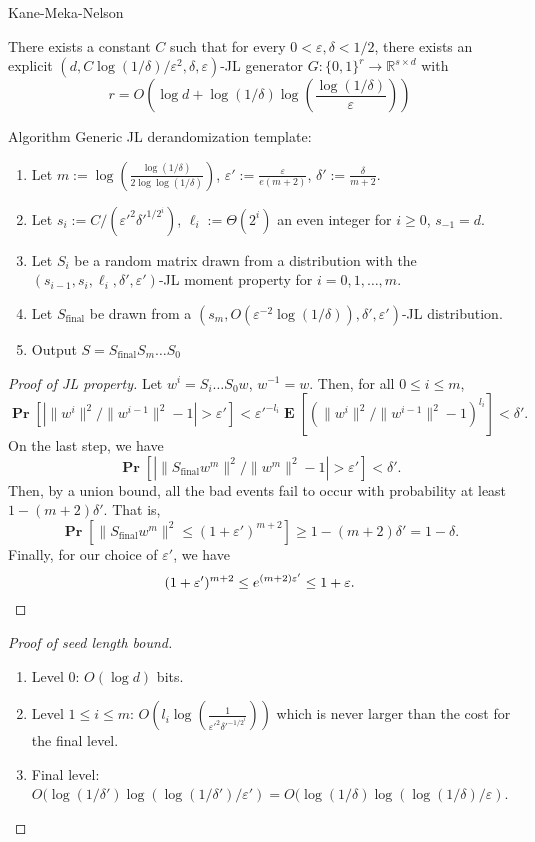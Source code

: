 \documentclass[10pt]{beamer}
\newcommand{\R}{\mathbb{R}}
\renewcommand{\P}{\operatorname*{\mathbf{Pr}}}
\newcommand{\E}{\operatorname*{\mathbf{E}}}
\renewcommand{\l}{\left}
\renewcommand{\r}{\right}
\newcommand{\eps}{\varepsilon}
\renewcommand{\d}{\displaystyle}
\begin{document}
\begin{frame}[allowframebreaks]{Kane-Meka-Nelson}
  \begin{theorem}
    \label{thm:main}
    There exists a constant $C$ such that for every
    $0<\eps,\delta<1/2$, there exists an explicit
    $(d,C\log(1/\delta)/\eps^2,\delta,\eps)$-JL generator
    $G:\{0,1\}^r\to \R^{s\times d}$ with
    \[
    r=O \l(\log d + \log(1/\delta)\log \l(\frac{\log(1/\delta)}{\eps}\r)\r)
    \]
  \end{theorem}

  \begin{block}{Algorithm}
    Generic JL derandomization template:
    \begin{enumerate}
    \item Let $m:=\d\log
      \l(\frac{\log(1/\delta)}{2\log\log(1/\delta)}\r)$,
      $\eps':=\d\frac{\eps}{e(m+2)}$, $\delta':=\d\frac{\delta}{m+2}$.
    \item Let $s_i:=C/(\eps'^2\delta'^{1/2^i})$, $\ell_i:=\Theta(2^i)$
      an even integer for $i\geq0$, $s_{-1}=d$.
    \item Let $S_i$ be a random matrix drawn from a distribution with
      the $(s_{i-1},s_i,\ell_i,\delta',\eps')$-JL moment property for
      $i=0,1,\ldots,m$.
    \item Let $S_{\text{final}}$ be drawn from a $\l(s_m, O
      \l(\eps^{-2}\log(1/\delta)\r),\delta',\eps'\r)$-JL distribution.
    \item Output $S=S_{\text{final}}S_m\ldots S_0$
    \end{enumerate}
  \end{block}

  \begin{proof}[Proof of JL property]
    Let $w^i=S_i\ldots S_0w$, $w^{-1}=w$. Then, for all $0\leq i \leq
    m$,
    \[
    \P\l[| \|w^i\|^2/\|w^{i-1}\|^2-1|>\eps'\r] <
    \eps'^{-l_i}\E\l[(\|w^i\|^2/\|w^{i-1}\|^2-1)^{l_i}\r]<\delta'.
    \]
    On the last step, we have
    \[
    \P\l[|\|S_{\text{final}}w^m\|^2/\|w^m\|^2-1| > \eps'\r]<\delta'.
    \]
    Then, by a union bound, all the bad events fail to occur with
    probability at least $1-(m+2)\delta'$. That is,
    \[
    \P\l[\|S_{\text{final}}w^m\|^2 \leq (1+\eps')^{m+2}\r] \geq 1-
    (m+2)\delta'=1-\delta.
    \]
    Finally, for our choice of $\eps'$, we have
    \[
    (1+\eps')^{m+2}\leq e^{(m+2)\eps'}\leq 1+\eps. \qedhere
    \]
  \end{proof}

  \begin{proof}[Proof of seed length bound]
    \begin{enumerate}
      \item Level $0$: $O(\log d)$ bits.
      \item Level $1\leq i \leq m$: $O(l_i\log
        \l(\frac{1}{\eps'^2\delta'^{-1/2^i}}\r))$ which is never
        larger than the cost for the final level.
      \item Final level: $O(\log(1/\delta')\log(\log(1/\delta')/\eps')
        = O(\log(1/\delta)\log(\log(1/\delta)/\eps)$.
    \end{enumerate}


\end{proof}
\end{frame}
\end{document}
